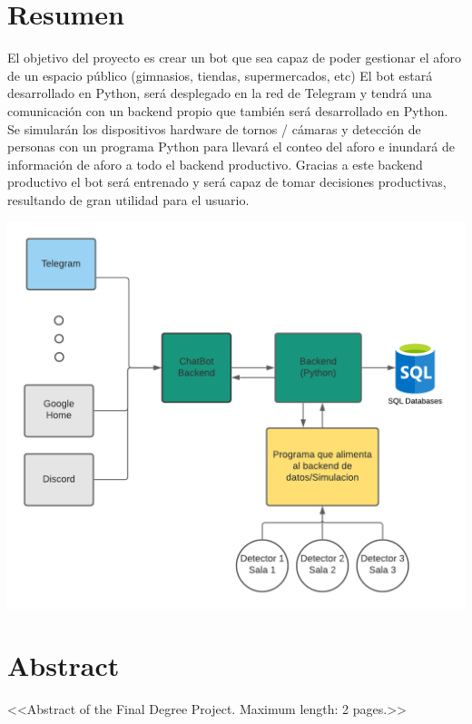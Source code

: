 \chapter{Resumen}
El objetivo del proyecto es crear un bot que sea capaz de poder gestionar el aforo de un espacio público (gimnasios, tiendas, supermercados, etc)
El bot estará desarrollado en Python, será desplegado en la red de Telegram y tendrá una comunicación con un backend propio que también será desarrollado en Python. 
Se simularán los dispositivos hardware de tornos / cámaras y detección de personas con un programa Python para llevará el conteo del aforo e inundará de información de aforo a todo el backend productivo.
Gracias a este backend productivo el bot será entrenado y será capaz de tomar decisiones productivas, resultando de gran utilidad para el usuario.

\begin{center}
    \includegraphics[scale=0.25]{imagenes/dig1/dig1.png}
\end{center}

\chapter{Abstract}
<<Abstract of the Final Degree Project. Maximum length: 2 pages.>>

